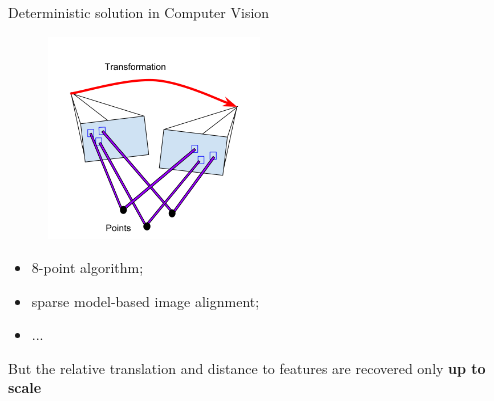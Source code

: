 \documentclass{beamer}
\begin{document}
\begin{frame}{Deterministic solution in Computer Vision}

\begin{figure}
\centering
\includegraphics[width=0.5\textwidth]{images/directMethod.png}
\end{figure}

\begin{itemize}
\item 8-point algorithm;
\item sparse model-based image alignment;
\item ...
\end{itemize}


But the relative translation and distance to features are recovered only \textbf{up to scale}

\end{frame}



%
\end{document}
